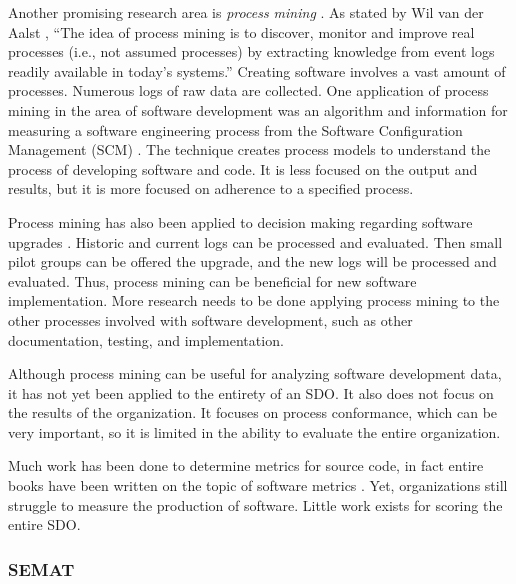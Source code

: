 \documentclass[SDSUThesis.tex]{subfiles}
\begin{document}
    Another promising research area is \textit{process mining}
    \cite{vanderAalst2012}.
    As stated by Wil van der Aalst \cite{vanderAalst2011}, 
    ``The idea of process mining is to discover, monitor
    and improve real
    processes (i.e., not assumed processes) by extracting knowledge from event logs
    readily available in today's systems.''  Creating software involves
    a vast amount of processes.  Numerous logs of raw data are collected.  
    One application of process mining in the area of software development
    was an algorithm and information for measuring a software engineering process from
    the Software Configuration Management (SCM) \cite{Rubin2007}.
    The technique creates process models 
    to understand the process of developing software and code. 
    It is less focused on the output and results,
    but it is more focused on adherence to a specified process.
    
    Process mining has also been applied to decision making regarding software 
    upgrades \cite{Genuchten2014}.  Historic and current logs can be 
    processed and evaluated.
    Then small pilot groups can be offered the upgrade, and the new logs will 
    be processed and evaluated. Thus, process mining can be beneficial for new 
    software implementation.  More research needs to be done applying
    process mining to the other processes involved with software development,
    such as other documentation, testing, and implementation. 
    
    Although process mining can be useful for analyzing software
    development data, it has not yet been applied to the entirety 
    of an SDO. It also does not
    focus on the results of the organization.  It focuses
    on process conformance, which can be very important, so it
    is limited in the ability to evaluate the entire organization. 

    Much work has been done to determine metrics for source code, in fact 
    entire books have been written on the topic of software 
    metrics \cite{Jones1996, Putnam2013}. Yet, 
    organizations still struggle to measure the production of software.
    Little work exists
    for scoring the entire SDO. 

\subsubsection{SEMAT}
\end{document}
